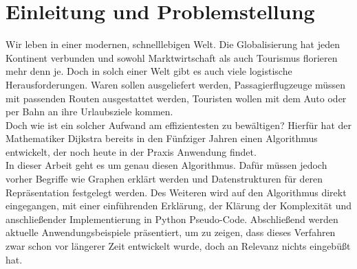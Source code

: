 \chapter{Einleitung und Problemstellung}

Wir leben in einer modernen, schnelllebigen Welt. Die Globalisierung hat jeden Kontinent verbunden und sowohl Marktwirtschaft als auch Tourismus florieren mehr denn je. 
Doch in solch einer Welt gibt es auch viele logistische Herausforderungen. Waren sollen ausgeliefert werden, Passagierflugzeuge müssen mit passenden Routen ausgestattet werden, Touristen wollen mit dem Auto oder per Bahn an ihre Urlaubsziele kommen. \\
Doch wie ist ein solcher Aufwand am effizientesten zu bewältigen? 
Hierfür hat der Mathematiker Dijkstra bereits in den Fünfziger Jahren einen Algorithmus entwickelt, der noch heute in der Praxis Anwendung findet. \\
In dieser Arbeit geht es um genau diesen Algorithmus. 
Dafür müssen jedoch vorher Begriffe wie \glqq Graphen \grqq erklärt werden und Datenstrukturen für deren Repräsentation festgelegt werden.
Des Weiteren wird auf den Algorithmus direkt eingegangen, mit einer einführenden Erklärung, der Klärung der Komplexität und anschließender Implementierung in Python Pseudo-Code.
Abschließend werden aktuelle Anwendungsbeispiele präsentiert, um zu zeigen, dass dieses Verfahren zwar schon vor längerer Zeit entwickelt wurde, doch an Relevanz nichts eingebüßt hat.
\\
\\
